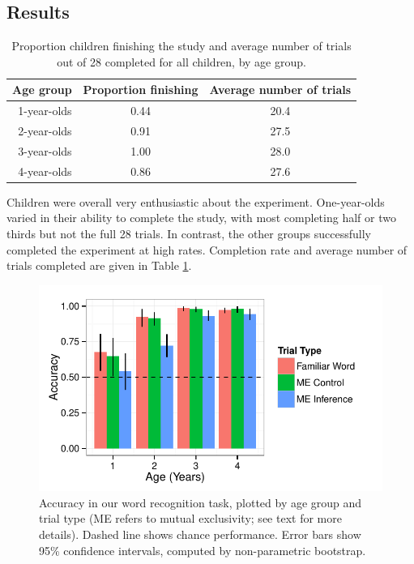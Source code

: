 \documentclass[man,noapacite]{apa2}
\begin{document}
\subsection{Results}


\begin{table}[t]
\centering
\caption{Proportion children finishing the study and average number of trials out of 28 completed for all children, by age group.\label{tab:completion}}

\begin{tabular}{rcc}
  \hline
Age group & Proportion finishing & Average number of trials \\ 
  \hline
1-year-olds & 0.44 & 20.4 \\ 
2-year-olds & 0.91 & 27.5 \\ 
3-year-olds & 1.00 & 28.0 \\ 
4-year-olds & 0.86 & 27.6 \\ 
   \hline
\end{tabular}
\end{table}

Children were overall very enthusiastic about the experiment. One-year-olds varied in their ability to complete the study, with most completing half or two thirds but not the full 28 trials. In contrast, the other groups successfully completed the experiment at high rates. Completion rate and average number of trials completed are given in Table \ref{tab:completion}.

\begin{figure}[t] 
  \begin{center} 
    \includegraphics[width=5in]{figures/accuracy.pdf} 
    \caption{\label{fig:accuracy} Accuracy in our word recognition task, plotted by age group and trial type (ME refers to mutual exclusivity; see text for more details). Dashed line shows chance performance. Error bars show 95\% confidence intervals, computed by non-parametric bootstrap. }
  \end{center} 
\end{figure}
\end{document}
